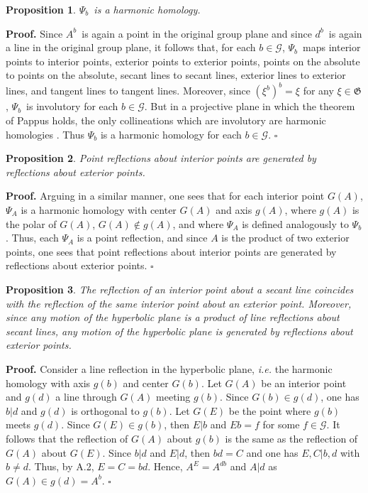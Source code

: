 \documentclass[a4paper,twoside,12pt]{article}
\newtheorem{prop}{Proposition}[section]
\newenvironment{proof}{\medskip \noindent 
            {\bf Proof.}}{ \hfill $\square$ \medskip}
\begin{document}
\begin{prop} $\Psi_{b}$\ is a harmonic homology.
\end{prop}

\begin{proof} Since $A^{b}$\ is again a point in the original group plane
and since $d^{b}$\ is again a line in the original group plane, 
it follows that, for each 
$b\in\mathcal{G}$, $\Psi _{b}$\ maps interior points to interior points,
exterior points to exterior points, points on the absolute to points
on the absolute, secant lines to secant lines, exterior lines to
exterior lines, and tangent lines to tangent lines.  Moreover, since
$(\xi^{b})^{b} = \xi$ for any $\xi \in \mathfrak{G}$, $\Psi_{b}$\ is
involutory for each $b\in \mathcal{G}$. But in a projective plane in
which the theorem of Pappus holds, the only collineations which are
involutory are harmonic homologies \cite{BK}. Thus $\Psi_{b}$ is a
harmonic homology for each $b\in \mathcal{G}$.
\end{proof}

\begin{prop} Point reflections about interior points are generated
by reflections about exterior points.
\end{prop}

\begin{proof} Arguing in a similar manner, one sees that for each 
interior point $G(A)$, $\Psi_{A}$ is a harmonic homology with center 
$G(A)$ and axis $g(A)$, where $g(A)$ is the polar of $G(A)$,
$G(A)\notin g(A)$, and where $\Psi_{A}$ is defined analogously to 
$\Psi_{b}$. Thus, each $\Psi_{A}$ is a point reflection, and since 
$A$ is the product of two exterior points, one sees that point reflections 
about interior points are generated by reflections about exterior points.
\end{proof}

\begin{prop} The reflection of an interior point about a secant
line coincides with the reflection of the same interior point about 
an exterior point. Moreover, since any motion of the hyperbolic plane 
is a product of line reflections about secant lines, any motion of the 
hyperbolic plane is generated by reflections about exterior points.
\end{prop}

\begin{proof} Consider a line reflection in the hyperbolic plane, {\it i.e.}
the harmonic homology with axis $g(b)$ and center $G(b)$. Let $G(A)$
be an interior point and $g(d)$ a line through $G(A)$ meeting $g(b)$.
Since $G(b)\in g(d)$, one has $b | d$ and $g(d)$ is orthogonal to $g(b)$.
Let $G(E)$ be the point where $g(b)$ meets $g(d)$. Since $G(E)\in g(b)$,
then $E | b$ and $Eb=f$ for some $f\in \mathcal{G}$. It follows
that the reflection of $G(A)$ about $g(b)$ is the same as the reflection
of $G(A)$ about $G(E)$. Since $b | d$ and $E|d$, then $bd=C$ and
one has $E,C | b,d$ with $b\neq d$. Thus, by A.2, $E=C=bd$. Hence,
$A^{E}=A^{db}$ and $A|d$ as $G(A)\in g(d) = A^{b}$.
\end{proof}
\end{document}
